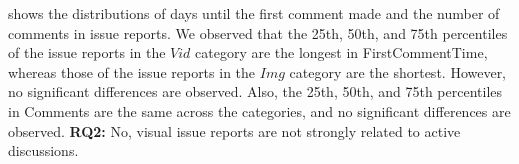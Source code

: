 shows the distributions of days until the first comment made and the number of comments in issue reports. 
We observed that the 25th, 50th, and 75th percentiles of the issue reports in the $Vid$ category are the longest in FirstCommentTime, whereas those of the issue reports in the $Img$ category are the shortest. 
However, no significant differences are observed. 
Also, the 25th, 50th, and 75th percentiles in Comments are the same across the categories, and no significant differences are observed. 
\vspace{-0.2cm}%
\summarybox
{{\bf RQ2: }{
    No, visual issue reports are not strongly related to active discussions. 
}}
